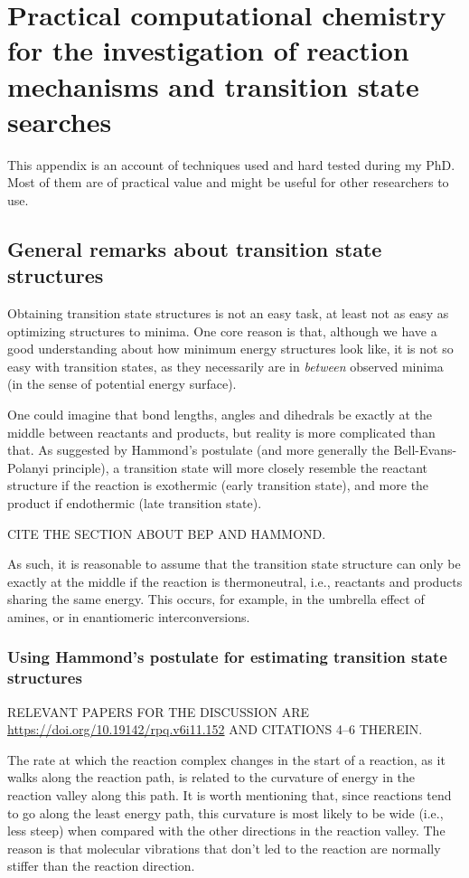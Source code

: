 \chapter{Practical computational chemistry for the investigation of reaction
  mechanisms and transition state searches}%
\label{ch:tutorial}

This appendix is an account of techniques used and hard tested during my PhD.
Most of them are of practical value and might be useful for other researchers
to use.

\section{General remarks about transition state structures}

Obtaining transition state structures is not an easy task, at least not as easy
as optimizing structures to minima.
One core reason is that, although we have a good understanding about how
minimum energy structures look like, it is not so easy with transition states,
as they necessarily are in \emph{between} observed minima (in the sense of
potential energy surface).

One could imagine that bond lengths, angles and dihedrals be exactly at the
middle between reactants and products, but reality is more complicated than
that.
As suggested by Hammond's postulate (and more generally the Bell-Evans-Polanyi
principle), a transition state will more closely resemble the reactant
structure if the reaction is exothermic (early transition state), and more the
product if endothermic (late transition state).

CITE THE SECTION ABOUT BEP AND HAMMOND.\@

As such, it is reasonable to assume that the transition state structure can
only be exactly at the middle if the reaction is thermoneutral, i.e., reactants
and products sharing the same energy.
This occurs, for example, in the umbrella effect of amines, or in enantiomeric
interconversions.

\subsection{Using Hammond's postulate for estimating transition state
	structures}

RELEVANT PAPERS FOR THE DISCUSSION ARE
\url{https://doi.org/10.19142/rpq.v6i11.152} AND CITATIONS 4--6 THEREIN.\@

The rate at which the reaction complex changes in the start of a reaction, as
it walks along the reaction path, is related to the curvature of energy in the
reaction valley along this path.
It is worth mentioning that, since reactions tend to go along the least energy
path, this curvature is most likely to be wide (i.e., less steep) when compared
with the other directions in the reaction valley.
The reason is that molecular vibrations that don't led to the reaction are
normally stiffer than the reaction direction.


